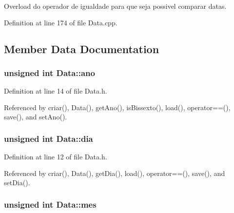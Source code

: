 Overload do operador de igualdade para que seja possivel comparar datas. 



Definition at line 174 of file Data.\+cpp.



\subsection{Member Data Documentation}
\hypertarget{class_data_a1811fab972bdf6ed644c4eb7412bd043}{
\subsubsection[{ano}]{\setlength{\rightskip}{0pt plus 5cm}unsigned int Data\+::ano\hspace{0.3cm}{\ttfamily [protected]}}}\label{class_data_a1811fab972bdf6ed644c4eb7412bd043}


Definition at line 14 of file Data.\+h.



Referenced by criar(), Data(), get\+Ano(), is\+Bissexto(), load(), operator==(), save(), and set\+Ano().

\hypertarget{class_data_a71a904380d17858da0b902e9a2563546}{
\subsubsection[{dia}]{\setlength{\rightskip}{0pt plus 5cm}unsigned int Data\+::dia\hspace{0.3cm}{\ttfamily [protected]}}}\label{class_data_a71a904380d17858da0b902e9a2563546}


Definition at line 12 of file Data.\+h.



Referenced by criar(), Data(), get\+Dia(), load(), operator==(), save(), and set\+Dia().

\hypertarget{class_data_a586deb479ec2031a0d3ceec8280f7706}{
\subsubsection[{mes}]{\setlength{\rightskip}{0pt plus 5cm}unsigned int Data\+::mes\hspace{0.3cm}{\ttfamily [protected]}}}\label{class_data_a586deb479ec2031a0d3ceec8280f7706}


